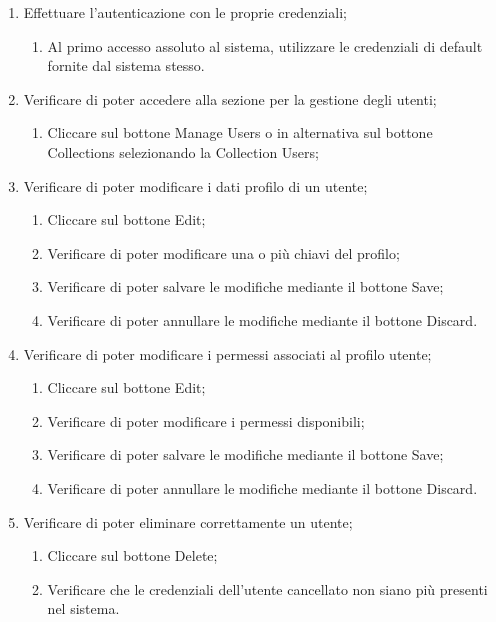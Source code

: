 \begin{enumerate}
\item Effettuare l'autenticazione con le proprie credenziali;
\begin{enumerate}
\item Al primo accesso assoluto al sistema, utilizzare le credenziali di default fornite dal sistema stesso.
\end{enumerate}
\item Verificare di poter accedere alla sezione per la gestione degli utenti;
\begin{enumerate}
\item Cliccare sul bottone Manage Users o in alternativa sul bottone Collections selezionando la Collection Users;
\end{enumerate}
\item Verificare di poter modificare i dati profilo di un utente;
\begin{enumerate}
\item Cliccare sul bottone Edit;
\item Verificare di poter modificare una o più chiavi del profilo;
\item Verificare di poter salvare le modifiche mediante il bottone Save;
\item Verificare di poter annullare le modifiche mediante il bottone Discard.
\end{enumerate}
\item Verificare di poter modificare i permessi associati al profilo utente;
\begin{enumerate}
\item Cliccare sul bottone Edit;
\item Verificare di poter modificare i permessi disponibili;
\item Verificare di poter salvare le modifiche mediante il bottone Save;
\item Verificare di poter annullare le modifiche mediante il bottone Discard.
\end{enumerate}
\item Verificare di poter eliminare correttamente un utente;
\begin{enumerate}
\item Cliccare sul bottone Delete;
\item Verificare che le credenziali dell'utente cancellato non siano più presenti nel sistema.
\end{enumerate}
\end{enumerate}


